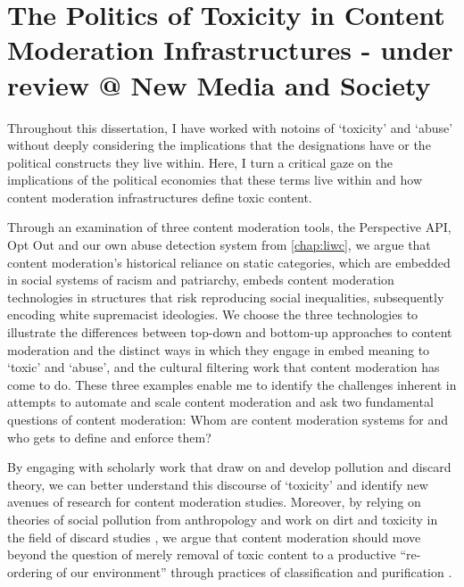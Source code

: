 \ifpdf
    \graphicspath{{Chapter9/Figs/Raster/}{Chapter9/Figs/PDF/}{Chapter9/Figs/}}
\else
    \graphicspath{{Chapter9/Figs/Vector/}{Chapter9/Figs/}}
\fi

\chapter{The Politics of Toxicity in Content Moderation Infrastructures - under review @ New Media and Society}\label{chap:filter}

Throughout this dissertation, I have worked with notoins of `toxicity' and `abuse' without deeply considering the implications that the designations have or the political constructs they live within. Here, I turn a critical gaze on the implications of the political economies that these terms live within and how content moderation infrastructures define toxic content.

Through an examination of three content moderation tools, the Perspective API, Opt Out and our own abuse detection system from \autoref{chap:liwc}, we argue that content moderation's historical reliance on static categories, which are embedded in social systems of racism and patriarchy, embeds content moderation technologies in structures that risk reproducing social inequalities, subsequently encoding white supremacist ideologies. We choose the three technologies to illustrate the differences between top-down and bottom-up approaches to content moderation and the distinct ways in which they engage in embed meaning to `toxic' and `abuse', and the cultural filtering work that content moderation has come to do. These three examples enable me to identify the challenges inherent in attempts to automate and scale content moderation and ask two fundamental questions of content moderation: Whom are content moderation systems for and who gets to define and enforce them?

By engaging with scholarly work that draw on and develop pollution and discard theory, we can better understand this discourse of `toxicity' and identify new avenues of research for content moderation studies. Moreover, by relying on theories of social pollution from anthropology \cite{Douglas:1966} and work on dirt and toxicity in the field of discard studies \cite{Libeoiron:2018,Lepawsky:2019}, we argue that content moderation should move beyond the question of merely removal of toxic content to a productive ``re-ordering of our environment'' through practices of classification and purification \cite{Douglas:1966}.

